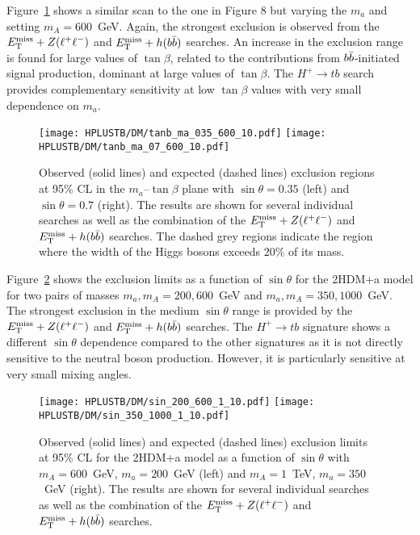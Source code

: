 Figure~\ref{Hplustb:2HDMa_tanb_ma} shows a similar scan to the one in Figure 8 but varying the $m_a$ and setting $m_A=600$~GeV. Again, the strongest exclusion is observed from the $E_{\text{T}}^{\text{miss}}+ Z(\ell^+\ell^-)$ and $E_{\text{T}}^{\text{miss}}+ h(b\bar{b})$ searches. An increase in the exclusion range is found for large values of $\tan\beta$, related to the contributions from $b\bar{b}$-initiated signal production, dominant at large values of $\tan\beta$. The $H^+\to tb$ search provides complementary sensitivity at low $\tan\beta$ values with very small dependence on $m_a$.

\begin{figure}[htb]
    \RawFloats
    \centering
    \texttt{[image: HPLUSTB/DM/tanb\_ma\_035\_600\_10.pdf]}
    \texttt{[image: HPLUSTB/DM/tanb\_ma\_07\_600\_10.pdf]}
    \caption{Observed (solid lines) and expected (dashed lines) exclusion regions at 95\% CL in the $m_a$--$\tan\beta$ plane with $\sin\theta=0.35$ (left) and $\sin\theta=0.7$ (right). The results are shown for several individual searches as well as the combination of the $E_{\text{T}}^{\text{miss}}+Z(\ell^+\ell^-)$ and $E_{\text{T}}^{\text{miss}}+h(b\bar{b})$ searches. The dashed grey regions indicate the region where the width of the Higgs bosons exceeds 20\% of its mass.}
    \label{Hplustb:2HDMa_tanb_ma}
\end{figure}

Figure~\ref{Hplustb:2HDMa_sintheta} shows the exclusion limits as a function of $\sin\theta$ for the 2HDM+a model for two pairs of masses $m_a,m_A = 200, 600$~GeV and $m_a,m_A=350,1000$~GeV. The strongest exclusion in the medium $\sin\theta$ range is provided by the $E_{\text{T}}^{\text{miss}}+ Z(\ell^+\ell^-)$ and $E_{\text{T}}^{\text{miss}}+ h(b\bar{b})$ searches. The $H^+\to tb$ signature shows a different $\sin\theta$ dependence compared to the other signatures as it is not directly sensitive to the neutral boson production. However, it is particularly sensitive at very small mixing angles.

\begin{figure}[htb]
    \RawFloats
    \centering
    \texttt{[image: HPLUSTB/DM/sin\_200\_600\_1\_10.pdf]}
    \texttt{[image: HPLUSTB/DM/sin\_350\_1000\_1\_10.pdf]}
    \caption{Observed (solid lines) and expected (dashed lines) exclusion limits at 95\% CL for the 2HDM+a model as a function of $\sin\theta$ with $m_A = 600$~GeV, $m_a = 200$~GeV (left) and $m_A = 1$~TeV, $m_a = 350$~GeV (right). The results are shown for several individual searches as well as the combination of the $E_{\text{T}}^{\text{miss}}+Z(\ell^+\ell^-)$ and $E_{\text{T}}^{\text{miss}}+h(b\bar{b})$ searches.}
    \label{Hplustb:2HDMa_sintheta}
\end{figure}

